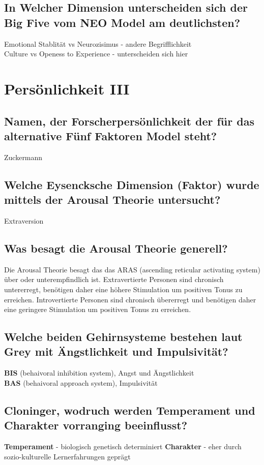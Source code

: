 \documentclass[a6paper,9pt,DIV=14]{scrartcl}
\begin{document}
\subsection{In Welcher Dimension unterscheiden sich der Big Five vom NEO Model am deutlichsten?} %
    Emotional Stablität vs Neurozisimus - andere Begrifflichkeit\\
    Culture vs Openess to Experience - unterscheiden sich hier

\section{Persönlichkeit III}
\subsection{Namen, der Forscherpersönlichkeit der für das alternative Fünf Faktoren Model steht?} %
Zuckermann
\subsection{Welche Eysencksche Dimension (Faktor) wurde mittels der Arousal Theorie untersucht?} %
Extraversion
\subsection{Was besagt die Arousal Theorie generell?} %
Die Arousal Theorie besagt das das ARAS (ascending reticular activating system) über oder unterempfindlich ist. Extravertierte Personen sind chronisch untererregt, benötigen daher eine höhere Stimulation um positiven Tonus zu erreichen. Introvertierte Personen sind chronisch übererregt und benötigen daher eine geringere Stimulation um positiven Tonus zu erreichen.
\subsection{Welche beiden Gehirnsysteme bestehen laut Grey mit Ängstlichkeit und Impulsivität?}
    \textbf{BIS} (behaivoral inhibition system), Angst und Ängstlichkeit\\
    \textbf{BAS} (behaivoral approach system), Impulsivität\\
\subsection{Cloninger, wodruch werden Temperament und Charakter vorranging beeinflusst?}
    \textbf{Temperament} - biologisch genetisch determiniert
    \textbf{Charakter} - eher durch sozio-kulturelle Lernerfahrungen geprägt
\end{document}
